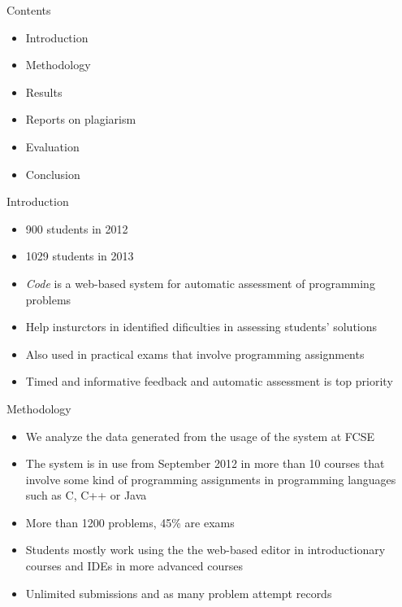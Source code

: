 
\begin{frame}{Contents}
	\begin{itemize}
	  \item Introduction
	  \item Methodology
	  \item Results
    \item Reports on plagiarism
	  \item Evaluation
    \item Conclusion
	\end{itemize}
\end{frame}

\begin{frame}{Introduction}
	\begin{itemize}
    \item 900 students in 2012
    \item 1029 students in 2013
	  \item \emph{Code} is a web-based system for automatic assessment of programming problems
	  \item Help insturctors in identified dificulties in assessing students' solutions
	  \item Also used in practical exams that involve programming assignments
	  \item Timed and informative feedback and automatic assessment is top priority
	\end{itemize}
\end{frame}

\begin{frame}{Methodology}
    \begin{itemize}
      \item We analyze the data generated from the usage of the system at FCSE
      \item The system is in use from September 2012 in more than 10 courses that involve some kind of programming
      assignments in programming languages such as C, C++ or Java
      \item More than 1200 problems, 45\% are exams
      \item Students mostly work using the the web-based editor in introductionary courses and IDEs in more advanced courses
      \item Unlimited submissions and as many problem attempt records
    \end{itemize}
\end{frame}

